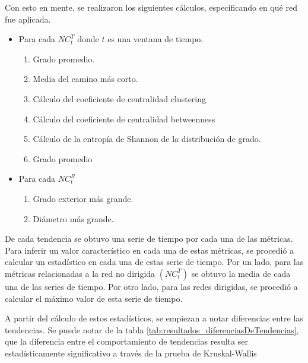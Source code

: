 \documentclass[../main.tex]{subfiles}
\begin{document}
Con esto en mente, se realizaron los siguientes cálculos, especificando en qué red fue aplicada.  

\begin{itemize}
    \item Para cada $NC_{t}^{T}$ donde $t$ es una ventana de tiempo.  
    \begin{enumerate}
        \item Grado promedio.
        \item Media del camino más corto. 
        \item Cálculo del coeficiente de centralidad clustering
        \item Cálculo del coeficiente de centralidad betweenness %
        \item Cálculo de la entropía de Shannon de la distribución de grado. 
        \item Grado promedio 
    \end{enumerate}
    \item Para cada $NC_{t}^{R}$  
    \begin{enumerate}
        \item Grado exterior más grande. 
        \item Diámetro más grande. 
    \end{enumerate}
\end{itemize}

De cada tendencia se obtuvo una serie de tiempo por cada una de las métricas. Para inferir un valor característico en cada una de estas métricas, se procedió a calcular un estadístico en cada una de estas serie de tiempo. Por un lado, para las métricas relacionadas a la red no dirigida $(NC_{t}^{T})$ se obtuvo la media de cada una de las  series de tiempo. Por otro lado, para las redes dirigidas, se procedió a calcular el máximo valor de esta serie de tiempo. 

A partir del cálculo de estos estadísticos, se empiezan a notar diferencias entre las tendencias. Se puede notar de la tabla \ref{tab:resultados_diferenciasDeTendencias}, que la diferencia entre el comportamiento de tendencias resulta ser estadísticamente significativo a través de la prueba de Kruskal-Wallis %
\end{document}
